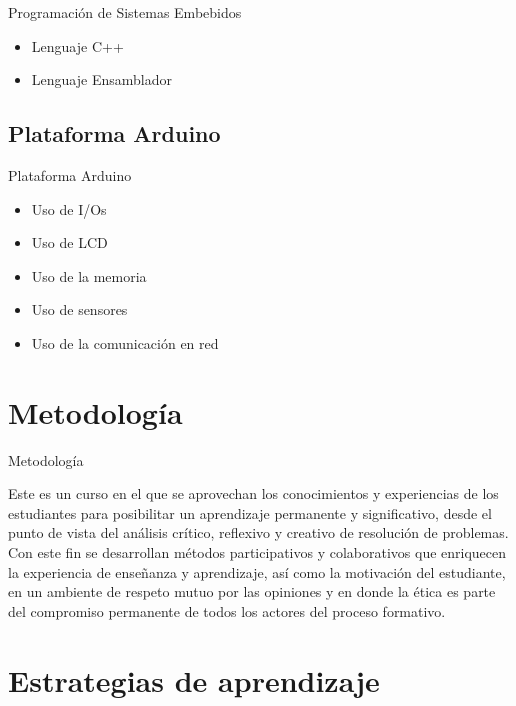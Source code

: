 \documentclass[handout,xcolor=dvipsnames]{beamer}
\newcommand{\pageframe}[1]{\frame{\begin{center}{ \Huge #1 }\end{center}}}
\begin{document}
\begin{frame}{Programación de Sistemas Embebidos}
\begin{block}{}
\begin{itemize}
 \item Lenguaje C++
 \item Lenguaje Ensamblador
\end{itemize}
\end{block}
\end{frame}

\subsection[Arduino]{Plataforma Arduino}

\begin{frame}{Plataforma Arduino}
\begin{block}{}
\begin{itemize}
 \item Uso de I/Os
 \item Uso de LCD
 \item Uso de la memoria
 \item Uso de sensores
 \item Uso de la comunicación en red
\end{itemize}
\end{block}
\end{frame}

\section{Metodología}

\pageframe{Metodología}

\begin{frame}{Metodología}

Este es un curso en el que se aprovechan los conocimientos y experiencias de los estudiantes para posibilitar un aprendizaje permanente y significativo, desde el punto de vista del análisis crítico, reflexivo y creativo de resolución de problemas. Con este fin se desarrollan métodos participativos y colaborativos que enriquecen la experiencia de enseñanza y aprendizaje, así como la motivación del estudiante, en un ambiente de respeto mutuo por las opiniones y en donde la ética es parte del compromiso permanente de todos los actores del proceso formativo.

\end{frame}

\section{Estrategias de aprendizaje}
\end{document}
